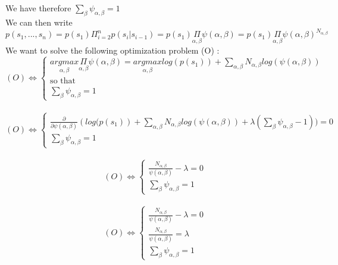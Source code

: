 \documentclass[12pt,a4paper]{report} %
\begin{document}
We have therefore $\underset{{\beta}}\sum \psi_{\alpha, \beta} = 1$ \\

We can then write $p(s_1, ..., s_n) = p(s_1)\Pi_{i=2}^n p(s_i|s_{i-1}) = p(s_1) \underset{{\alpha, \beta}}\Pi \psi(\alpha, \beta) =p(s_1)\underset{{\alpha, \beta}}\Pi \psi(\alpha, \beta)^{N_{\alpha, \beta}}$ \\

We want to solve the following optimization problem (O) : \\

\[ (O) \Leftrightarrow
 \left\{
\begin{array}{l}
\text{$\underset{{\alpha, \beta}}{argmax} \underset{{\alpha, \beta}}\Pi \psi(\alpha, \beta) = \underset{{\alpha, \beta}}{argmax} log(p(s_1)) + \underset{{\alpha, \beta}}\sum N_{\alpha, \beta} log(\psi(\alpha, \beta))$} \\
\text{so that}\\
\text{$\underset{{\beta}}\sum \psi_{\alpha, \beta} = 1$}
\end{array}
\right.
\] \\

\[ (O) \Leftrightarrow
 \left\{
\begin{array}{l}
\text{$\frac{\partial}{\partial \psi(\alpha, \beta)}(log\big(p(s_1)) +  \underset{{\alpha, \beta}}\sum N_{\alpha, \beta} log(\psi(\alpha, \beta)) + \lambda (\underset{{\beta}}\sum \psi_{\alpha, \beta} - 1)\big) = 0$} \\
\text{$\underset{{\beta}}\sum \psi_{\alpha, \beta} = 1$}
\end{array}
\right.
\] \\

\[ (O) \Leftrightarrow
 \left\{
\begin{array}{l}
\text{$\frac{N_{\alpha, \beta}}{\psi(\alpha,\beta)} - \lambda=0$} \\
\text{$\underset{{\beta}}\sum \psi_{\alpha, \beta} = 1$}
\end{array}
\right.
\] \\

\[ (O) \Leftrightarrow
 \left\{
\begin{array}{l}
\text{$\frac{N_{\alpha, \beta}}{\psi(\alpha,\beta)} - \lambda=0$} \\
\text{$\frac{N_{\alpha, \beta}}{\psi(\alpha,\beta)} = \lambda$} \\
\text{$\underset{{\beta}}\sum \psi_{\alpha, \beta} = 1$}
\end{array}
\right.
\] \\
\end{document}

